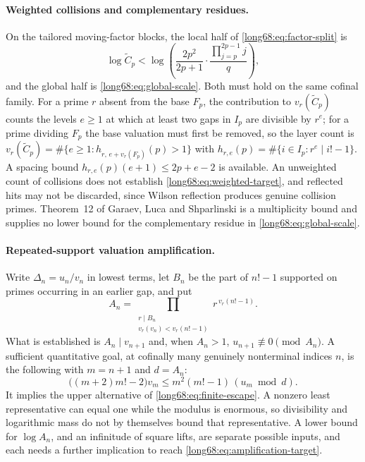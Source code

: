 \paragraph{Weighted collisions and complementary residues.}
On the tailored moving-factor blocks, the local half of
\eqref{long68:eq:factor-split} is
\begin{equation}\label{long68:eq:weighted-target}
 \log\widetilde C_p
 <\log\left(\frac{2p^2}{2p+1}\cdot
       \frac{\prod_{j=p}^{2p-1}j}{q}\right),
\end{equation}
and the global half is \eqref{long68:eq:global-scale}.  Both must hold on the same
cofinal family.  For a prime $r$ absent from the base $F_p$, the contribution
to $v_r(\widetilde C_p)$ counts the levels $e\ge1$ at which at least two gaps
in $I_p$ are divisible by $r^e$; for a prime dividing $F_p$ the base
valuation must first be removed, so the layer count is
$v_r(\widetilde C_p)=\#\{e\ge1:h_{r,\,e+v_r(F_p)}(p)>1\}$ with
$h_{r,e}(p)=\#\{i\in I_p:r^e\mid i!-1\}$.  A spacing bound
$h_{r,e}(p)(e+1)\le2p+e-2$ is available.  An unweighted count of collisions
does not establish \eqref{long68:eq:weighted-target}, and reflected hits may not be
discarded, since Wilson reflection produces genuine collision primes.
Theorem~12 of Garaev, Luca and Shparlinski
\cite[arXiv v1, Thm.~12, p.~16]{garaev-luca-shparlinski} is a multiplicity
bound and supplies no lower bound for the complementary residue in
\eqref{long68:eq:global-scale}.

\paragraph{Repeated-support valuation amplification.}
Write $\Delta_n=u_n/v_n$ in lowest terms, let $B_n$ be the part of $n!-1$
supported on primes occurring in an earlier gap, and put
\[
 A_n=\prod_{\substack{r\mid B_n\\ v_r(v_n)<v_r(n!-1)}}r^{\,v_r(n!-1)} .
\]
What is established is $A_n\mid v_{n+1}$ and, when $A_n>1$,
$u_{n+1}\not\equiv0\pmod{A_n}$.  A sufficient quantitative goal, at cofinally
many genuinely nonterminal indices $n$, is the following with $m=n+1$ and
$d=A_n$:
\begin{equation}\label{long68:eq:amplification-target}
 \bigl((m+2)m!-2\bigr)v_m
 \le m^2(m!-1)\,(u_m\bmod d).
\end{equation}
It implies the upper alternative of \eqref{long68:eq:finite-escape}.  A nonzero
least representative can equal one while the modulus is enormous, so
divisibility and logarithmic mass do not by themselves bound that
representative.  A lower bound for $\log A_n$, and an infinitude of square
lifts, are separate possible inputs, and each needs a further implication to
reach \eqref{long68:eq:amplification-target}.

